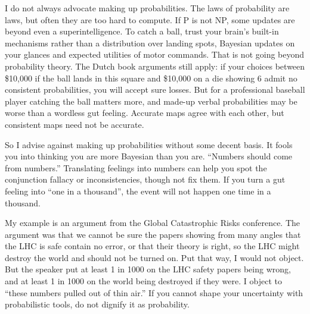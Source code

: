 
I do not always advocate making up probabilities. The laws of probability are laws, but often they are too hard to compute. If P is not NP, some updates are beyond even a superintelligence.  To catch a ball, trust your brain's built-in mechanisms rather than a distribution over landing spots, Bayesian updates on your glances and expected utilities of motor commands. That is not going beyond probability theory. The Dutch book arguments still apply: if your choices between \$10,000 if the ball lands in this square and \$10,000 on a die showing 6 admit no consistent probabilities, you will accept sure losses. But for a professional baseball player catching the ball matters more, and made-up verbal probabilities may be worse than a wordless gut feeling. Accurate maps agree with each other, but consistent maps need not be accurate.

So I advise against making up probabilities without some decent basis. It fools you into thinking you are more Bayesian than you are. ``Numbers should come from numbers.'' Translating feelings into numbers can help you spot the conjunction fallacy or inconsistencies, though not fix them. If you turn a gut feeling into ``one in a thousand'', the event will not happen one time in a thousand. 

My example is an argument from the Global Catastrophic Risks conference.  The argument was that we cannot be sure the papers showing from many angles that the LHC is safe contain no error, or that their theory is right, so the LHC might destroy the world and should not be turned on. Put that way, I would not object. But the speaker put at least 1 in 1000 on the LHC safety papers being wrong, and at least 1 in 1000 on the world being destroyed if they were. I object to ``these numbers pulled out of thin air.'' If you cannot shape your uncertainty with probabilistic tools, do not dignify it as probability. 

